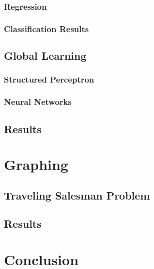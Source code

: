 \documentclass[12pt]{report}
\begin{document}
\subsection{Regression}
\subsection{Classification Results}

\section{Global Learning}
\subsection{Structured Perceptron}
\subsection{Neural Networks}

\section{Results}

\chapter{Graphing}
\section{Traveling Salesman Problem}

\section{Results}

\chapter{Conclusion}


{}
\end{document}
